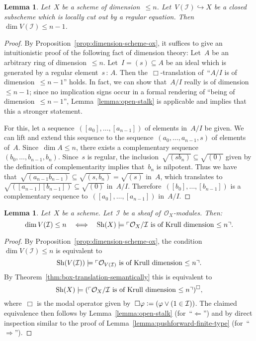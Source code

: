 \documentclass[10pt]{amsart}
\theoremstyle{definition}
\theoremstyle{plain}
\newtheorem{lemma}[defn]{Lemma}
\theoremstyle{remark}
\renewcommand{\O}{\mathcal{O}}
\newcommand{\I}{\mathcal{I}}
\newcommand{\Sh}{\mathrm{Sh}}
\newcommand{\?}{\,{:}\,}
\renewcommand{\_}{\mathpunct{.}\,}
\newcommand{\speak}[1]{\ulcorner\text{\textnormal{#1}}\urcorner}
\newcommand{\defeq}{\vcentcolon=}
\begin{document}
\begin{lemma}Let~$X$ be a scheme of dimension~$\leq n$. Let~$V(\I)
\hookrightarrow X$ be a closed subscheme which is locally cut out by a regular
equation. Then~$\dim V(\I) \leq n-1$.\end{lemma}
\begin{proof}By Proposition~\ref{prop:dimension-scheme-ox}, it suffices to give
an intuitionistic proof of the following fact of dimension theory: Let~$A$ be
an arbitrary ring of dimension~$\leq n$. Let~$I = (s) \subseteq A$ be an ideal
which is generated by a regular element~$s\?A$. Then the~$\Box$-translation
of~``$A/I$ is of dimension~$\leq n-1$'' holds. In fact, we can show that~$A/I$
really is of dimension~$\leq n-1$; since no implication signs occur in a formal rendering of ``being of dimension~$\leq n-1$'',
Lemma~\ref{lemma:open-stalk} is applicable and implies
that this a stronger statement.

For this, let a sequence~$([a_0],\ldots,[a_{n-1}])$ of elements in~$A/I$ be
given. We can lift and extend this sequence to the
sequence~$(a_0,\ldots,a_{n-1},s)$ of elements of~$A$. Since~$\dim A \leq n$,
there exists a complementary sequence~$(b_0,\ldots,b_{n-1},b_n)$.
Since~$s$ is regular, the inclusion~$\sqrt{(s b_n)} \subseteq \sqrt{(0)}$
given by the definition of complementarity implies that~$b_n$ is nilpotent.
Thus we have that~$\sqrt{(a_{n-1}b_{n-1})} \subseteq \sqrt{(s,b_n)} =
\sqrt{(s)}$ in~$A$, which translates to~$\sqrt{([a_{n-1}] [b_{n-1}])} \subseteq
\sqrt{(0)}$ in~$A/I$.  Therefore~$([b_0],\ldots,[b_{n-1}])$ is a complementary
sequence to~$([a_0],\ldots,[a_{n-1}])$ in~$A/I$.
\end{proof}

\begin{lemma}\label{lemma:dim-closed-subscheme}
Let~$X$ be a scheme. Let~$\I$ be a sheaf of~$\O_X$-modules. Then:
\[ \dim V(\I) \leq n \quad\Longleftrightarrow\quad
  \Sh(X) \models \speak{$\O_X/\I$ is of Krull dimension~$\leq n$}. \]
\end{lemma}
\begin{proof}By Proposition~\ref{prop:dimension-scheme-ox}, the condition~$\dim
V(\I) \leq n$ is equivalent to
\[ \Sh(V(\I)) \models \speak{$\O_{V(\I)}$ is of Krull dimension~$\leq n$}. \]
By Theorem~\ref{thm:box-translation-semantically} this is equivalent to
\[ \Sh(X) \models (\speak{$\O_X/\I$ is of Krull dimension~$\leq n$})^\Box, \]
where~$\Box$ is the modal operator given by~$\Box\varphi \defeq (\varphi \vee
(1\in\I))$. The claimed equivalence then follows by
Lemma~\ref{lemma:open-stalk} (for~``$\Leftarrow$'') and by direct inspection
similar to the proof of Lemma~\ref{lemma:pushforward-finite-type}
(for~``$\Rightarrow$'').
\end{proof}
\end{document}
